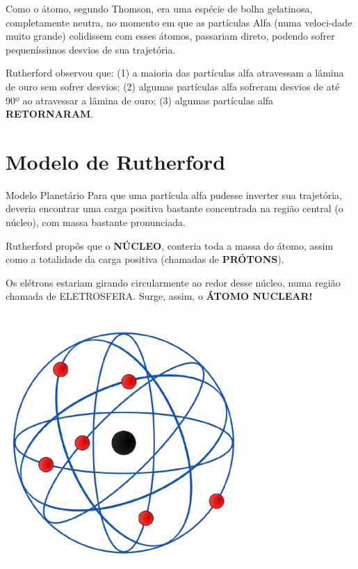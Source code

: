 \documentclass[10pt]{scrartcl}
\begin{document}
Como o átomo, segundo Thomson, era uma espécie de  bolha  gelatinosa,  completamente  neutra,  no  momento em que as partículas Alfa (numa veloci-dade muito grande) colidissem com esses átomos, passariam  direto,  podendo  sofrer  pequeníssimos  desvios de sua trajetória.

Rutherford observou que: (1) a maioria das partículas alfa atravessam a lâmina de ouro sem sofrer desvios; (2) algumas partículas alfa sofreram desvios de até 90º  ao  atravessar  a  lâmina  de  ouro;  (3)  algumas  partículas alfa \textbf{RETORNARAM}.

\section{Modelo de Rutherford}
\label{sec:org59b49d4}

\begin{Box2}{Modelo Planetário}
Para que uma partícula alfa pudesse inverter sua trajetória,  deveria  encontrar  uma  carga  positiva  bastante concentrada na região central (o núcleo), com massa bastante pronunciada.

Rutherford propôs que o \textbf{NÚCLEO}, conteria toda a massa do átomo, assim como a totalidade da carga positiva (chamadas de \textbf{PRÓTONS}).

Os  elétrons  estariam  girando  circularmente  ao  redor  desse  núcleo,  numa  região  chamada  de  ELETROSFERA. Surge, assim, o \textbf{ÁTOMO NUCLEAR!}

\begin{center}
\includegraphics[scale=0.25]{./Quimica-Geral-Aula/atomo-nuclear.png}
\end{center}

\end{Box2}
\end{document}
